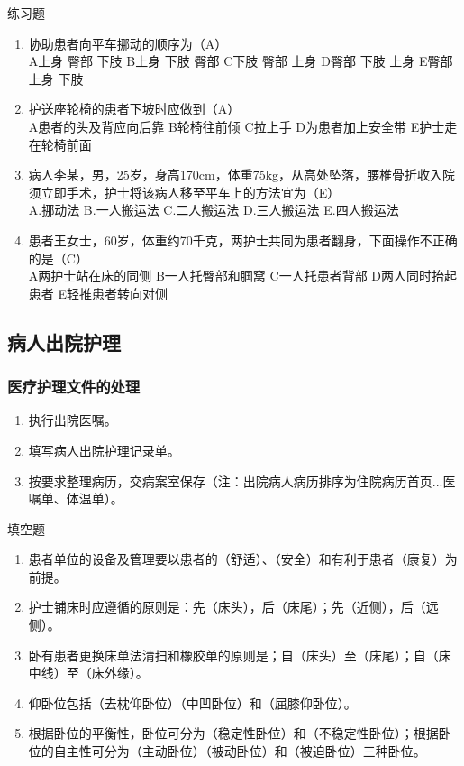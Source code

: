 \documentclass[11pt, a4paper]{ctexart}
\begin{document}
\begin{examplebox}{练习题}
\begin{enumerate}
    \item 协助患者向平车挪动的顺序为（A）\\
    A上身 臀部 下肢 \quad B上身 下肢 臀部 \quad C下肢 臀部 上身 \quad D臀部 下肢 上身 \quad E臀部 上身 下肢
    \item 护送座轮椅的患者下坡时应做到（A）\\
    A患者的头及背应向后靠 \quad B轮椅往前倾 \quad C拉上手 \quad D为患者加上安全带 \quad E护士走在轮椅前面
    \item 病人李某，男，25岁，身高170cm，体重75kg，从高处坠落，腰椎骨折收入院须立即手术，护士将该病人移至平车上的方法宜为（E）\\
    A.挪动法 \quad B.一人搬运法 \quad C.二人搬运法 \quad D.三人搬运法 \quad E.四人搬运法
    \item 患者王女士，60岁，体重约70千克，两护士共同为患者翻身，下面操作不正确的是（C）\\
    A两护士站在床的同侧 \quad B一人托臀部和腘窝 \quad C一人托患者背部 \quad D两人同时抬起患者 \quad E轻推患者转向对侧
\end{enumerate}
\end{examplebox}

\subsection{病人出院护理}
\subsubsection{医疗护理文件的处理}
\begin{enumerate}
    \item 执行出院医嘱。
    \item 填写病人出院护理记录单。
    \item 按要求整理病历，交病案室保存（注：出院病人病历排序为住院病历首页...医嘱单、体温单）。
\end{enumerate}

\begin{tipsbox}{填空题}
\begin{enumerate}
    \item 患者单位的设备及管理要以患者的（舒适）、（安全）和有利于患者（康复）为前提。
    \item 护士铺床时应遵循的原则是：先（床头），后（床尾）；先（近侧），后（远侧）。
    \item 卧有患者更换床单法清扫和橡胶单的原则是；自（床头）至（床尾）；自（床中线）至（床外缘）。
    \item 仰卧位包括（去枕仰卧位）（中凹卧位）和（屈膝仰卧位）。
    \item 根据卧位的平衡性，卧位可分为（稳定性卧位）和（不稳定性卧位）；根据卧位的自主性可分为（主动卧位）（被动卧位）和（被迫卧位）三种卧位。
\end{enumerate}
\end{tipsbox}
\end{document}
